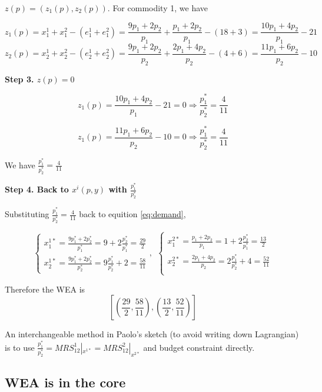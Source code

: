 \documentclass{article}
\begin{document}
$z(p) = (z_1(p),z_2(p))$. For commodity 1, we have

$$z_1(p) = x^1_1 + x^2_1 - (e^1_1 + e^2_1)= \frac{9p_1+2p_2}{p_1} + \frac{p_1+2p_2}{p_1} - (18 +3) = \frac{10p_1+4p_2}{p_1}-21 $$
$$z_2(p) = x^1_2 + x^2_2 - (e^1_2 + e^2_2) = \frac{9p_1+2p_2}{p_2}  + \frac{2p_1+4p_2}{p_2}  - (4+6) = \frac{11p_1+6p_2}{p_2} -10$$

\textbf{Step 3. $z(p) = 0$}


$$z_1(p) = \frac{10p_1+4p_2}{p_1}-21 =0 \Rightarrow \frac{p_1^*}{p_2^*} = \frac{4}{11}$$

$$z_1(p) = \frac{11p_1+6p_2}{p_2} -10 =0 \Rightarrow \frac{p_1^*}{p_2^*} = \frac{4}{11}$$


We have $\frac{p_1^*}{p_2^*} = \frac{4}{11}$

\textbf{Step 4. Back to $x^i(p,y)$ with $\frac{p_1^*}{p_2^*}$}


Substituting $\frac{p_1^*}{p_2^*} = \frac{4}{11}$ back to equition \ref{eq:demand},


\begin{equation}
    \begin{cases}
x^{1*}_1 = \frac{9p^*_1+2p^*_2}{p^*_1} = 9+ 2\frac{p_2^*}{p_1^*} = \frac{29}{2} \\
x^{1*}_2 = \frac{9p^*_1+2p^*_2}{p^*_2} = 9\frac{p_1^*}{p_2^*} +2 =
\frac{58}{11}    \end{cases}
, \ \
    \begin{cases}
x^{2*}_1 = \frac{p_1+2p_2}{p_1} =1 + 2\frac{p_2^*}{p_1^*} = \frac{13}{2} \\
x^{2*}_2 = \frac{2p_1+4p_2}{p_2} =  2\frac{p_1^*}{p_2^*} +4= \frac{52}{11}\\
    \end{cases}
\label{eq:wea}
\end{equation}


Therefore the WEA is $$[(\frac{29}{2},\frac{58}{11} ),(\frac{13}{2},\frac{52}{11})]$$

\begin{mdframed}[backgroundcolor=blue!20,linecolor=white]

An interchangeable method in Paolo's sketch (to avoid writing down Lagrangian) is to use $\frac{p^*_1}{p^*_2} = MRS^1_{12} |_{x^{1*}} = MRS^2_{12}|_{x^{2*}}$ and budget constraint directly. 

\end{mdframed}


\subsection{WEA is in the core}
\end{document}
